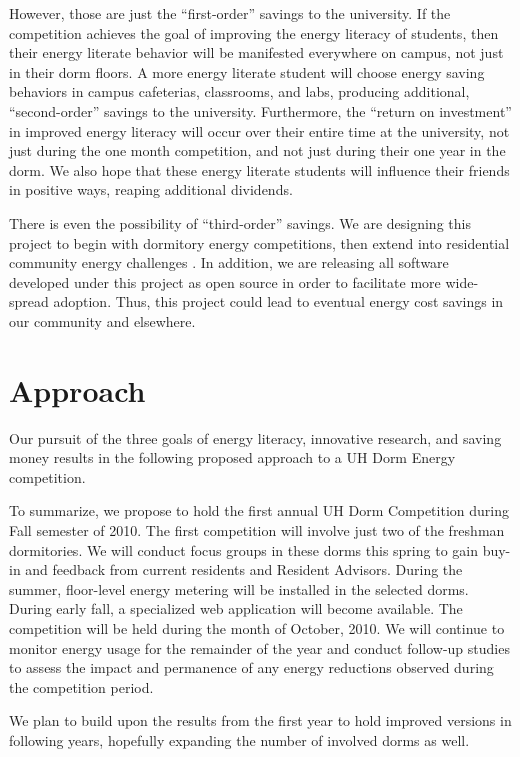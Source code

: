 \documentclass[11pt]{article}
\begin{document}
However, those are just the ``first-order'' savings to the university.  If
the competition achieves the goal of improving the energy literacy of
students, then their energy literate behavior will be manifested everywhere
on campus, not just in their dorm floors.  A more energy literate student
will choose energy saving behaviors in campus cafeterias, classrooms, and
labs, producing additional, ``second-order'' savings to the university.
Furthermore, the ``return on investment'' in improved energy literacy will
occur over their entire time at the university, not just during the one
month competition, and not just during their one year in the dorm.  We also
hope that these energy literate students will influence their friends in
positive ways, reaping additional dividends.

There is even the possibility of ``third-order'' savings.  We are designing
this project to begin with dormitory energy competitions, then extend into
residential community energy challenges \cite{csdl2-09-15}.  In addition,
we are releasing all software developed under this project as open source
in order to facilitate more wide-spread adoption.  Thus, this project could
lead to eventual energy cost savings in our community and elsewhere.

\section{Approach}
\label{sec:approach}

Our pursuit of the three goals of energy literacy, innovative research, and
saving money results in the following proposed approach to a UH Dorm
Energy competition.  

To summarize, we propose to hold the first annual UH Dorm Competition
during Fall semester of 2010.  The first competition will involve just two
of the freshman dormitories. We will conduct focus groups in these dorms this
spring to gain buy-in and feedback from current residents and Resident
Advisors.  During the summer, floor-level energy metering will be installed
in the selected dorms.  During early fall, a specialized web application
will become available. The competition will be held during the month of
October, 2010.  We will continue to monitor energy usage for the remainder
of the year and conduct follow-up studies to assess the impact and
permanence of any energy reductions observed during the competition period.

We plan to build upon the results from the first year to hold improved
versions in following years, hopefully expanding the number of involved
dorms as well. 
\end{document}
